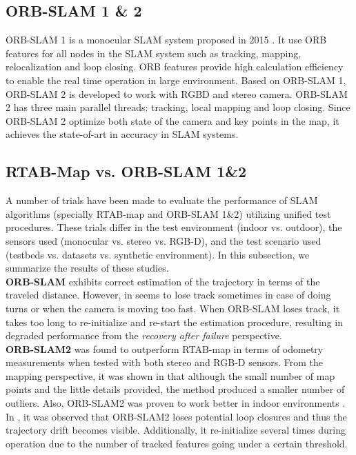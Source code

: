 \documentclass[12pt]{article}
\begin{document}
\subsection{ORB-SLAM 1 \& 2}
ORB-SLAM 1 is a monocular SLAM system proposed in 2015 \cite{mur2015orb}. It use ORB features for all nodes in the SLAM system such as tracking, mapping, relocalization and loop closing. ORB features provide high calculation efficiency to enable the real time operation in large environment. Based on ORB-SLAM 1, ORB-SLAM 2 is developed to work with RGBD and stereo camera.  ORB-SLAM 2 has three main parallel threads: tracking, local mapping and loop closing. Since ORB-SLAM 2 optimize both state of the camera and key points in the map, it achieves the state-of-art in accuracy in SLAM systems. 
\subsection{RTAB-Map vs. ORB-SLAM 1\&2}
A number of trials have been made to evaluate the performance of SLAM algorithms (specially RTAB-map and ORB-SLAM 1\&2)  utilizing unified test procedures. These trials differ in the test environment (indoor vs. outdoor), the sensors used (monocular vs. stereo vs. RGB-D), and the test scenario used (testbeds vs. datasets vs. synthetic environment). In this subsection, we summarize the results of these studies. \\
\indent\textbf{ORB-SLAM} exhibits correct estimation of the trajectory in terms of the traveled distance. However, in seems to lose track sometimes in case of doing turns \cite{study2018} or when the camera is moving too fast. When ORB-SLAM loses track, it takes too long to re-initialize and re-start \cite{8806213} the estimation procedure, resulting in degraded performance from the \textit{recovery after failure} perspective.\\
\indent\textbf{ORB-SLAM2} was found to outperform RTAB-map in terms of odometry measurements \cite{8806213} when tested with both stereo and RGB-D sensors. From the mapping perspective, it was shown in \cite{8710464} that although the small number of map points and the little details provided, the method produced a smaller number of outliers. Also, ORB-SLAM2 was proven to work better in indoor environments \cite{8806213}\cite{8710464}. In \cite{8215331}, it was observed that ORB-SLAM2 loses potential loop closures and thus the trajectory drift becomes visible. Additionally, it re-initialize several times during operation due to the number of tracked features going under a certain threshold. \\
\end{document}
